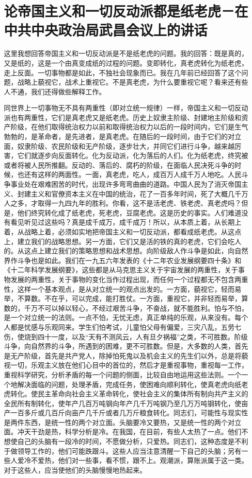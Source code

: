 \section[论帝国主义和一切反动派都是纸老虎－在中共中央政治局武昌会议上的讲话（一九五八年十二月一日）]{论帝国主义和一切反动派都是纸老虎－在中共中央政治局武昌会议上的讲话}


这里我想回答帝国主义和一切反动派是不是纸老虎的问题。我的回答：既是真的，又是纸的，这是一个由真变成纸的过程的问题。变即转化，真老虎转化为纸老虎，走上反面。一切事物都是如此，不独社会现象而已。我在几年前已经回答了这个问题，战略上藐视它，战术上重视它。不是真老虎，为什么要重视它呢？看来还有些人不通，我们还得做些解释工作。

同世界上一切事物无不具有两重性（即对立统一规律）一样，帝国主义和一切反动派也有两重性，它们是真老虎又是纸老虎。历史上奴隶主阶级、封建地主阶级和资产阶级，在他们取得统治权力以前和取得统治权力以后的一段时间内，它们是生气勃勃的，是革命者，是先进者，是真老虎。在随后的一段时间，由于它们的对立面，奴隶阶级、农民阶级和无产阶级，逐步壮大，并同它们进行斗争，越来越厉害，它们就逐步向反面转化。化为反动派，化为落后的人们。化为纸老虎，终究被或者将被人民所推翻。反动的、落后的、腐朽的阶级，在面临人民决死斗争的时候，也还有这样的两面性。一面，真老虎，吃人，成百万人成千万人地吃。人民斗争事业处在艰难困苦的时代，出现许多弯弯曲曲的道路。中国人民为了消灭帝国主义、封建主义和官僚资本主义在中国的统治，花了一百多年时间，死了大概几千万人之多，才取得一九四九年的胜利。你看，这不是活老虎、铁老虎、真老虎吗？但是，他们终究转化成了纸老虎，死老虎，豆腐老虎。这是历史的事实。人们难道没有看见听见过这些吗？真是成千成万，成千成万！所以，从本质上着，从长期上着，从战略上着，必须如实地把帝国主义和一切反动派，都看成纸老虎。从这点上，建立我们的战略思想。另一方面，它们又是活的铁的真的老虎，它们会吃人的。从这点上建立我们的策略思想和战术思想。向阶级敌人作斗争是如此，向自然界作斗争也是如此。我们在一九五六年发表的《十二年农业发展纲要四十条》和《十二年科学发展纲要》，这些都是从马克思主义关于宇宙发展的两重性，关于事物发展的两重性，关于事物的变化当作过程出现，而任何一个过程都无不包含两重性，这样一个基本观点，是从对立统一的观点出发的。一方面，藐视它，轻而易举，不算数。不在乎，可以完成，能打胜仗。一方面，重视它，并非轻而易举，算数的，千万不可以掉以轻心，不经过艰苦斗争，不奋战，就不能胜利。怕与不怕，是一个对立统一的法则。一点不怕，无忧无虑，真正单纯的乐观，从来没有。每个人都是忧感与乐观同来。学生们怕考试，儿童怕父母有偏爱，三灾八乱，五劳七伤，使烧到四十一度，以及“天有不测风云，人有旦夕祸福”之类，不可胜数。阶级斗争，向自然界的斗争，所遇到的困难，更不可胜数。但是，大多数的人类，首先是无产阶级，首先是共产党人，除掉怕死鬼以及机会主义的先生们以外，总是将藐视一切，乐观主义放在他们心目中的首位的，然后才是重视事物，重视每一工作，重视科学研究，分析矛盾的每一个问题的侧面，比较自由地运用这些法则。一个一个地解决面临的问题，处理矛盾，完成任务，使困难向顺利转化，使真老虎向纸老虎转化。使民主革命向社会主义革命转化，使社会主义的集体所有制向共产主义的全民所有制转化，使年产几百万吨钢向年产几千万吨钢乃至几万万吨钢转化，使亩产一百多斤或几百斤向亩产几千斤或者几万斤粮食转化。同志们，可能性与现实性是两件东西，是统一性的两个对立面。头脑要冷又要热，又是统一性的两个对立面。冲天干劲是热，科学分析是冷。在我国，在目前，有些人太热了一点。他们不想使自己的头脑有一段冷的时间，不愿做分析，只爱热。同志们，这种态度是不利于做领导工作的，他们可能跌跟斗。这些人应当注意清醒一下自己的头脑；另有一些人爱冷不爱热，他们对一些事，看不惯，跟不上。观潮派，算账派属于这一类。对于这些人，应当使他们的头脑慢慢地热起来。


